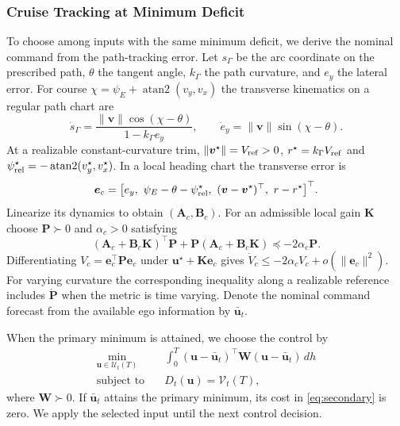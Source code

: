 \documentclass[journal]{IEEEtran}
\theoremstyle{definition}
\newcommand{\vct}[1]{\boldsymbol{#1}}
\newcommand{\mtx}[1]{\mathbf{#1}}
\begin{document}
\subsubsection{Cruise Tracking at Minimum Deficit}
To choose among inputs with the same minimum deficit, we derive the
nominal command from the path-tracking error.
Let $s_\Gamma$ be the arc coordinate on the prescribed path, $\theta$
the tangent angle, $k_\Gamma$ the path curvature, and $e_y$ the lateral
error. For course $\chi=\psi_E+\operatorname{atan2}(v_y,v_x)$ the
transverse kinematics on a regular path chart are
\begin{equation*}
 \dot s_\Gamma=\frac{\|\vct v\|\cos(\chi-\theta)}
                       {1-k_\Gamma e_y},\qquad
 \dot e_y=\|\vct v\|\sin(\chi-\theta).
\end{equation*}
At a realizable constant-curvature trim, $\|\vct v^\star\|=V_{\rm ref}>0$,
$r^\star=k_\Gamma V_{\rm ref}$ and
$\psi^\star_{\rm rel}=-\operatorname{atan2}(v_y^\star,v_x^\star)$.
In a local heading chart the transverse error is
\begin{equation*}
 \vct e_c=\bigl[e_y,\ \psi_E-\theta-\psi^\star_{\rm rel},\
               (\vct v-\vct v^\star)^\top,\ r-r^\star\bigr]^\top .
\end{equation*}
Linearize its dynamics to obtain $(\mtx A_c,\mtx B_c)$. For an
admissible local gain $\mtx K$ choose $\mtx P\succ0$ and $\alpha_c>0$ satisfying
\begin{equation*}
 (\mtx A_c+\mtx B_c\mtx K)^\top\mtx P+
 \mtx P(\mtx A_c+\mtx B_c\mtx K)\preceq-2\alpha_c\mtx P .
\end{equation*}
Differentiating $V_c=\vct e_c^\top\mtx P\vct e_c$ under
$\vct u^\star+\mtx K\vct e_c$ gives
$\dot V_c\le-2\alpha_c V_c+o(\|\vct e_c\|^2)$. For varying curvature
the corresponding inequality along a realizable reference includes
$\dot{\mtx P}$ when the metric is time varying. Denote the nominal
command forecast from the available ego information by $\bar{\vct u}_t$.

When the primary minimum is attained, we choose the control by
\begin{equation}\label{eq:secondary}
\begin{aligned}
 \min_{\vct u\in\mathcal U_t(T)}\quad&
 \int_0^T (\vct u-\bar{\vct u}_t)^\top\mtx W
                     (\vct u-\bar{\vct u}_t)\,dh\\
 \text{subject to}\quad&D_t(\vct u)=\mathcal V_t(T),
\end{aligned}
\end{equation}
where $\mtx W\succ0$. If $\bar{\vct u}_t$ attains the primary minimum,
its cost in \eqref{eq:secondary} is zero. We apply the selected input
until the next control decision.
\end{document}
